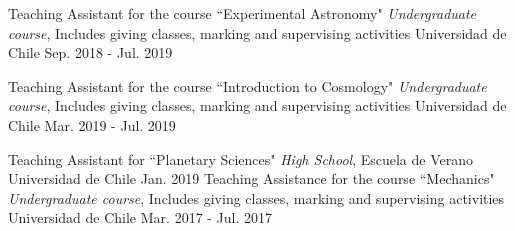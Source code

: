 

\begin{cvhonors}
	\cvhonor
	{Teaching Assistant for the course ``Experimental Astronomy"} %
	{\textit{Undergraduate course}, Includes giving classes, marking and supervising activities} %
	{Universidad de Chile} %
	{Sep. 2018 - Jul. 2019} %
	
	\cvhonor
	{Teaching Assistant for the course ``Introduction to Cosmology"} %
	{\textit{Undergraduate course}, Includes giving classes, marking and supervising activities} %
	{Universidad de Chile} %
	{Mar. 2019 - Jul. 2019} %
	
	\cvhonor
	{Teaching Assistant for ``Planetary Sciences"} %
	{\textit{High School}, Escuela de Verano} %
	{Universidad de Chile} %
	{Jan. 2019} %
%	
%	
	\cvhonor
	{Teaching Assistance for the course ``Mechanics"} %
	{\textit{Undergraduate course}, Includes giving classes, marking and supervising activities} %
	{Universidad de Chile} %
	{Mar. 2017 - Jul. 2017} %
	
\end{cvhonors}
